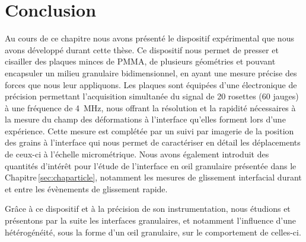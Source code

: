 \section{Conclusion}

Au cours de ce chapitre nous avons présenté le dispositif expérimental que nous avons développé durant cette thèse. Ce dispositif nous permet de presser et cisailler des plaques minces de PMMA, de plusieurs géométries et pouvant encapsuler un milieu granulaire bidimensionnel, en ayant une mesure précise des forces que nous leur appliquons. Les plaques sont équipées d'une électronique de précision permettant l'acquisition simultanée du signal de 20 rosettes (60 jauges) à une fréquence de \SI{4}{\mega\hertz}, nous offrant la résolution et la rapidité nécessaires à la mesure du champ des déformations à l'interface qu'elles forment lors d'une expérience. Cette mesure est complétée par un suivi par imagerie de la position des grains à l'interface qui nous permet de caractériser en détail les déplacements de ceux-ci à l'échelle micrométrique. Nous avons également introduit des quantités d'intérêt pour l'étude de l'interface en œil granulaire présentée dans le Chapitre\,\ref{sec:chaparticle}, notamment les mesures de glissement interfacial durant et entre les évènements de glissement rapide.

Grâce à ce dispositif et à la précision de son instrumentation, nous étudions et présentons par la suite les interfaces granulaires, et notamment l'influence d'une hétérogénéité, sous la forme d'un œil granulaire, sur le comportement de celles-ci.





